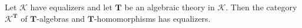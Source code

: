 Let $\mathcal{K}$ have equalizers and let $\mathbf{T}$ be an algebraic theory in $\mathcal{K}$. Then the category $\mathcal{K}^{\mathbf{T}}$ of $\mathbf{T}$-algebras and $\mathbf{T}$-homomorphisms has equalizers.

